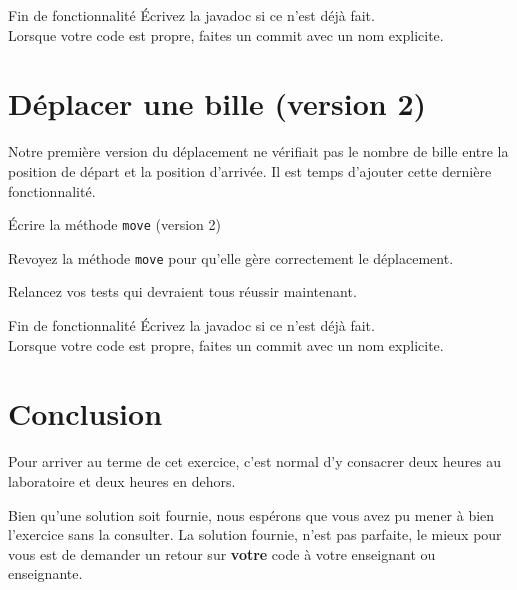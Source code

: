 \documentclass[a4paper,11pt]{style-esi/td}
\newcommand{\findefonctionnalite}{
\begin{infoit}{Fin de fonctionnalité}
	Écrivez la javadoc si ce n'est déjà fait.\\  
	Lorsque votre code est propre, faites un commit avec un nom explicite. 
\end{infoit}
}
\begin{document}
\findefonctionnalite 

\section{Déplacer une bille (version 2)}

Notre première version du déplacement ne vérifiait pas le nombre de bille entre
la position de départ et la position d'arrivée. Il est temps d'ajouter cette
dernière fonctionnalité. 

\begin{Exercice}{Écrire la méthode \texttt{move} (version 2)}
	\begin{steps}
	\item Revoyez la méthode \texttt{move} pour qu'elle gère correctement le 
		déplacement. 
	\item Relancez vos tests qui devraient tous réussir maintenant. 
	\end{steps}
\end{Exercice}

\findefonctionnalite 

\section{Conclusion}

Pour arriver au terme de cet exercice, c'est normal d'y consacrer deux heures au 
laboratoire et deux heures en dehors. 

Bien qu'une solution soit fournie, nous espérons que vous avez pu mener à bien
l'exercice sans la consulter. La solution fournie, n'est pas parfaite, le mieux
pour vous est de demander un retour sur \textbf{votre} code à votre enseignant
ou enseignante. 
\end{document}
